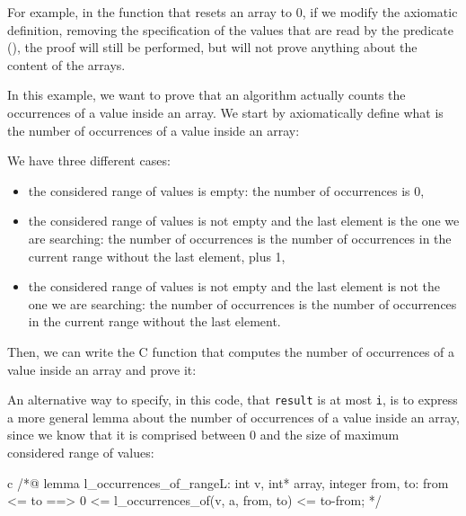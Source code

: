 For example, in the function that resets an array to 0, if we modify the
axiomatic definition, removing the specification of the values that are
read by the predicate (), the proof
will still be performed, but will not prove anything about the content
of the arrays.





In this example, we want to prove that an algorithm actually counts the
occurrences of a value inside an array. We start by axiomatically define
what is the number of occurrences of a value inside an array:






We have three different cases:

\begin{itemize}
\item
  the considered range of values is empty: the number of occurrences is
  0,
\item
  the considered range of values is not empty and the last element is
  the one we are searching: the number of occurrences is the number of
  occurrences in the current range without the last element, plus 1,
\item
  the considered range of values is not empty and the last element is
  not the one we are searching: the number of occurrences is the number
  of occurrences in the current range without the last element.
\end{itemize}

Then, we can write the C function that computes the number of
occurrences of a value inside an array and prove it:






An alternative way to specify, in this code, that \texttt{result} is at
most \texttt{i}, is to express a more general lemma about the number of
occurrences of a value inside an array, since we know that it is
comprised between 0 and the size of maximum considered range of values:



\begin{CodeBlock}{c}
/*@
lemma l_occurrences_of_range{L}:
  \forall int v, int* array, integer from, to:
    from <= to ==> 0 <= l_occurrences_of(v, a, from, to) <= to-from;
*/
\end{CodeBlock}



